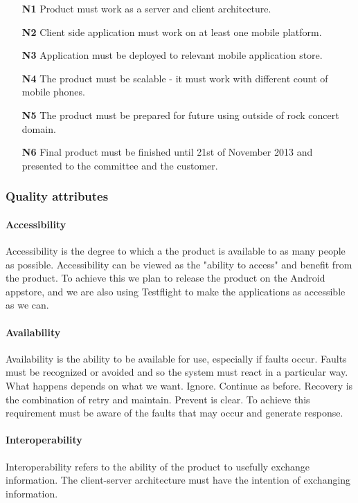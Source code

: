 \begin{enumerate}
\item[\textbf{N1}] \label{req_N1} Product must work as a server and client architecture.
\item[\textbf{N2}] \label{req_N2} Client side application must work on at least one mobile platform.
\item[\textbf{N3}] \label{req_N3} Application must be deployed to relevant mobile application store.
\item[\textbf{N4}] \label{req_N4} The product must be scalable - it must work with different count of mobile phones.
\item[\textbf{N5}] \label{req_N5} The product must be prepared for future using outside of rock concert domain.
\item[\textbf{N6}] \label{req_N6} Final product must be finished until 21st of November 2013 and presented to the committee and the customer.
\end{enumerate}

\subsubsection{Quality attributes}

\paragraph{Accessibility}
Accessibility is the degree to which a the product is available to as many people as possible. 
Accessibility can be viewed as the "ability to access" and benefit from the product. 
To achieve this we plan to release the product on the Android appstore, and we are also using Testflight to make the applications as accessible as we can.

\paragraph{Availability}

Availability is the ability to be available for use, especially if faults occur. Faults must be recognized or avoided and so the system must react in a particular way. What happens depends on what we want. Ignore. Continue as before. Recovery is the combination of retry and maintain. Prevent is clear. To achieve this requirement must be aware of the faults that may occur and generate response.

\paragraph{Interoperability}
Interoperability refers to the ability of the product to usefully exchange information. The client-server architecture must have the intention of exchanging information. 

